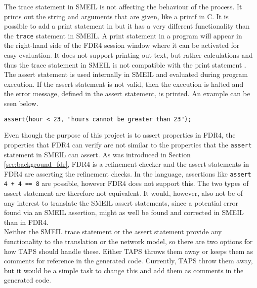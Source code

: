 The trace statement in SMEIL is not affecting the behaviour of the process. It prints out the string and arguments that are given, like a printf in C. It is possible to add a print statement in \cspm{} but it has a very different functionality than the \texttt{trace} statement in SMEIL. A print statement in a \cspm{} program will appear in the right-hand side of the FDR4 session window where it can be activated for easy evaluation. It does not support printing out text, but rather calculations and thus the trace statement in SMEIL is not compatible with the print statement \cspm.\\

The assert statement is used internally in SMEIL and evaluated during program execution. If the assert statement is not valid, then the execution is halted and the error message, defined in the assert statement, is printed. An example can be seen below.
\begin{verbatim}
assert(hour < 23, "hours cannot be greater than 23");
\end{verbatim}
Even though the purpose of this project is to assert properties in FDR4, the properties that FDR4 can verify are not similar to the properties that the \texttt{assert} statement in SMEIL can assert. As was introduced in Section \ref{sec:background_fdr}, FDR4 is a refinement checker and the assert statements in FDR4 are asserting the refinement checks. In the \cspm language, assertions like \texttt{assert 4 + 4 == 8} are possible, however FDR4 does not support this\cite{fdr4}. The two types of assert statement are therefore not equivalent. It would, however, also not be of any interest to translate the SMEIL assert statements, since a potential error found via an SMEIL assertion, might as well be found and corrected in SMEIL than in FDR4.\\

Neither the SMEIL trace statement or the assert statement provide any functionality to the translation or the network model, so there are two options for how TAPS should handle these. Either TAPS throws them away or keeps them as comments for reference in the generated code. Currently, TAPS throw them away, but it would be a simple task to change this and add them as comments in the generated \cspm{} code.\\

